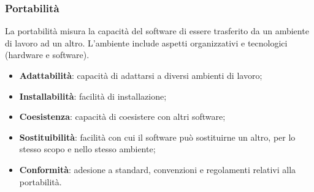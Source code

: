 \subsubsection{Portabilità}
La portabilità misura la capacità del software di essere trasferito da un ambiente di lavoro ad un altro.
L'ambiente include aspetti organizzativi e tecnologici (hardware e software).
\begin{itemize}
    \item \textbf{Adattabilità}: capacità di adattarsi a diversi ambienti di lavoro;
    \item \textbf{Installabilità}: facilità di installazione;
    \item \textbf{Coesistenza}: capacità di coesistere con altri software;
    \item \textbf{Sostituibilità}: facilità con cui il software può sostituirne un altro, per lo 
        stesso scopo e nello stesso ambiente;
    \item \textbf{Conformità}: adesione a standard, convenzioni e regolamenti relativi alla portabilità.
\end{itemize}